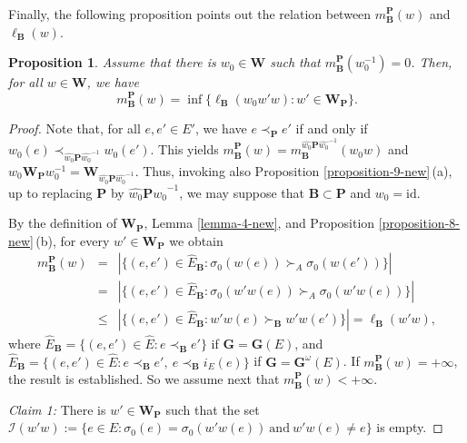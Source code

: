 \documentclass[12pt]{amsart}
\newtheorem{proposition}{Proposition}
\theoremstyle{definition}
\begin{document}
Finally, the following proposition points out the relation between  $m_\mathbf{B}^\mathbf{P}(w)$ and  $\ell_\mathbf{B}(w)$.

\begin{proposition}
\label{proposition-10-new}
Assume that there is $w_0\in\mathbf{W}$ such that $m_\mathbf{B}^\mathbf{P}(w_0^{-1})=0$.
Then, for all $w\in\mathbf{W}$, we have
\[m_\mathbf{B}^\mathbf{P}(w)=\inf\{\ell_\mathbf{B}(w_0w'w):w'\in\mathbf{W}_\mathbf{P}\}.\]
\end{proposition}

\begin{proof}
Note that, for all $e,e'\in E'$, we have $e\prec_\mathbf{P}e'$ if and only if $w_0(e)\prec_{\hat{w_0}\mathbf{P}\hat{w_0}^{-1}}w_0(e')$.
This yields $m_\mathbf{B}^\mathbf{P}(w)=m_\mathbf{B}^{\hat{w_0}\mathbf{P}\hat{w_0}^{-1}}(w_0w)$
and $w_0\mathbf{W}_{\mathbf{P}}w_0^{-1}=\mathbf{W}_{\hat{w_0}\mathbf{P}\hat{w_0}^{-1}}$. Thus, invoking also Proposition \ref{proposition-9-new}\,{\rm (a)}, up to replacing $\mathbf{P}$ by $\hat{w_0}\mathbf{P}\hat{w_0}^{-1}$, we may suppose that $\mathbf{B}\subset\mathbf{P}$ and $w_0=\mathrm{id}$.

By the definition of $\mathbf{W}_\mathbf{P}$, Lemma \ref{lemma-4-new}, and Proposition \ref{proposition-8-new}\,{\rm (b)}, for every $w'\in\mathbf{W}_\mathbf{P}$ we obtain
\begin{eqnarray*}
m_\mathbf{B}^\mathbf{P}(w) & = & |\{(e,e')\in\hat{E}_\mathbf{B}:\sigma_0(w(e))\succ_A\sigma_0(w(e'))\}| \\
 & = & |\{(e,e')\in\hat{E}_\mathbf{B}:\sigma_0(w'w(e))\succ_A \sigma_0(w'w(e))\}| \\
 & \leq & |\{(e,e')\in\hat{E}_\mathbf{B}:w'w(e)\succ_\mathbf{B}w'w(e')\}|=\ell_\mathbf{B}(w'w), \end{eqnarray*}
where $\hat{E}_\mathbf{B}=\{(e,e')\in\hat{E}:e\prec_\mathbf{B}e'\}$ if $\mathbf{G}=\mathbf{G}(E)$,
and $\hat{E}_\mathbf{B}=\{(e,e')\in\hat{E}:e\prec_\mathbf{B}e',\ e\prec_\mathbf{B}i_E(e)\}$ if $\mathbf{G}=\mathbf{G}^\omega(E)$.
If $m_\mathbf{B}^\mathbf{P}(w)=+\infty$, the result is established.
So we assume next that $m_\mathbf{B}^\mathbf{P}(w)<+\infty$.

\smallskip
\noindent
{\it Claim 1:} There is $w'\in\mathbf{W}_\mathbf{P}$ such that the set $\mathcal{I}(w'w):=\{e\in E:\sigma_0(e)=\sigma_0(w'w(e))\ \mbox{and}\ w'w(e)\not=e\}$ is empty.


\end{proof}
\end{document}
